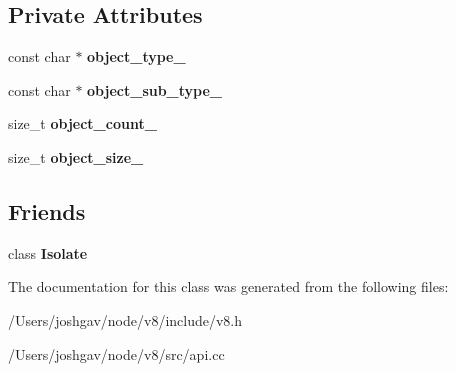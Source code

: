 \subsection*{Private Attributes}
\begin{DoxyCompactItemize}
\item 
const char $\ast$ {\bfseries object\+\_\+type\+\_\+}\hypertarget{classv8_1_1_heap_object_statistics_a990809fcfd32b55d2ad0aa4ec9452004}{}\label{classv8_1_1_heap_object_statistics_a990809fcfd32b55d2ad0aa4ec9452004}

\item 
const char $\ast$ {\bfseries object\+\_\+sub\+\_\+type\+\_\+}\hypertarget{classv8_1_1_heap_object_statistics_aa29ddbbedd1431276623fb6b12ef5945}{}\label{classv8_1_1_heap_object_statistics_aa29ddbbedd1431276623fb6b12ef5945}

\item 
size\+\_\+t {\bfseries object\+\_\+count\+\_\+}\hypertarget{classv8_1_1_heap_object_statistics_a7fc97890029c38eee4408acdc3013520}{}\label{classv8_1_1_heap_object_statistics_a7fc97890029c38eee4408acdc3013520}

\item 
size\+\_\+t {\bfseries object\+\_\+size\+\_\+}\hypertarget{classv8_1_1_heap_object_statistics_afe0db82334e2f2eb0e8d3a7932180534}{}\label{classv8_1_1_heap_object_statistics_afe0db82334e2f2eb0e8d3a7932180534}

\end{DoxyCompactItemize}
\subsection*{Friends}
\begin{DoxyCompactItemize}
\item 
class {\bfseries Isolate}\hypertarget{classv8_1_1_heap_object_statistics_aba4f0964bdacf2bbf62cf876e5d28d0a}{}\label{classv8_1_1_heap_object_statistics_aba4f0964bdacf2bbf62cf876e5d28d0a}

\end{DoxyCompactItemize}


The documentation for this class was generated from the following files\+:\begin{DoxyCompactItemize}
\item 
/\+Users/joshgav/node/v8/include/v8.\+h\item 
/\+Users/joshgav/node/v8/src/api.\+cc\end{DoxyCompactItemize}
